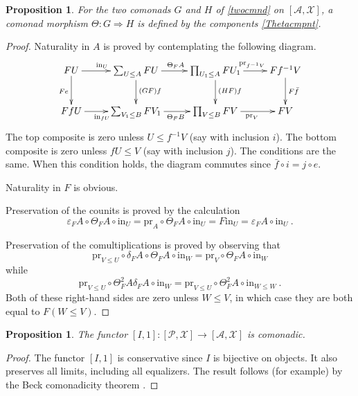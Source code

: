\documentclass[a4paper,12pt,reqno]{amsart}
\newtheorem{proposition}[theorem]{Proposition}
\theoremstyle{definition}
\theoremstyle{fact}
\theoremstyle{genquest}
\theoremstyle{step}
\newcommand{\lra}{\longrightarrow}
\newcommand{\Lra}{\Longrightarrow}
\def\CA{{\mathscr A}}
\def\CP{{\mathscr P}}
\def\CX{{\mathscr X}}
\begin{document}
\begin{proposition}
For the two comonads $G$ and $H$ of \eqref{twocmnd} on $[\CA,\CX]$, a comonad morphism $\Theta : G \Lra H$ is defined by the components \eqref{Thetacmpnt}.
\end{proposition}
\begin{proof}
Naturality in $A$ is proved by contemplating the following diagram.
\begin{equation*}
\xymatrix{
FU \ar[d]_{Fe}\ar[r]^{\mathrm{in}_U \ }  & \sum_{U\le A}{FU}\ar[d]^{(GF)f} \ar[r]^{\Theta_FA} & \prod_{U_1\le A}{FU_1} \ar[d]^{(HF)f} \ar[r]^{ \ \mathrm{pr}_{f^{-1}V}} 
& Ff^{-1}V \ar[d]^{F\bar{f}} \\
FfU\ar[r]_{\mathrm{in}_{fU} \ }  & \sum_{V_1\le B}{FV_1}\ar[r]_{\Theta_FB} & \prod_{V\le B}{FV}\ar[r]_{ \ \mathrm{pr}_V} 
& FV }
\end{equation*}
The top composite is zero unless $U\le f^{-1}V$ (say with inclusion $i$). 
The bottom composite is zero unless $fU\le V$ (say with inclusion $j$). 
The conditions are the same.
When this condition holds, the diagram commutes since $\bar{f} \circ i = j \circ e$.  

Naturality in $F$ is obvious. 

Preservation of the counits is proved by the calculation
$$\varepsilon_FA\circ \Theta_FA \circ \mathrm{in}_U = \mathrm{pr}_A\circ \Theta_FA \circ \mathrm{in}_U
= F\mathrm{in}_U = \varepsilon_FA\circ \mathrm{in}_U \ .$$ 

Preservation of the comultiplications is proved by observing that 
$$\mathrm{pr}_{V\le U} \circ \delta_FA \circ \Theta_FA \circ \mathrm{in}_W
= \mathrm{pr}_{V} \circ \Theta_FA \circ \mathrm{in}_W$$
while
$$\mathrm{pr}_{V\le U} \circ \Theta^2_FA \delta_FA  \circ \mathrm{in}_W
= \mathrm{pr}_{V\le U} \circ \Theta^2_FA \circ \mathrm{in}_{W\le W} \ .$$
Both of these right-hand sides are zero unless $W\le V$, in which case they
are both equal to $F(W\le V)$. 
\end{proof}

\begin{proposition}
The functor $[I,1] : [\CP,\CX]\lra [\CA,\CX]$ is comonadic.
\end{proposition}
\begin{proof}
The functor $[I,1]$ is conservative since $I$ is bijective on objects.
It also preserves all limits, including all equalizers.
The result follows (for example) by the Beck comonadicity theorem \cite{ML1963}.
\end{proof}
\end{document}
